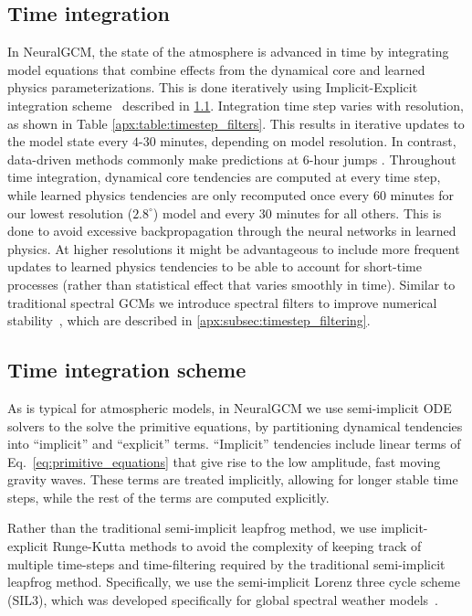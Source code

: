 \documentclass[sn-nature,Numbered]{sn-jnl}%
\begin{document}
\begin{appendices}
\section{Time integration}\label{apx:sec:time_integration}
In NeuralGCM, the state of the atmosphere is advanced in time by
integrating model equations that combine effects from the dynamical
core and learned physics parameterizations. This is done iteratively
using Implicit-Explicit integration scheme~\cite{whitaker2013implicit}
described in \ref{apx:subsec:sil3}. Integration time step varies with
resolution, as shown in Table \ref{apx:table:timestep_filters}. This
results in iterative updates to the model state every $4$-$30$
minutes, depending on model resolution. In contrast, data-driven
methods commonly make predictions at $6$-hour jumps
\cite{lam2022graphcast,keisler2022forecasting}.  Throughout time
integration, dynamical core tendencies are computed at every time
step, while learned physics tendencies are only recomputed once every
$60$ minutes for our lowest resolution ($2.8^{\circ}$) model and every
$30$ minutes for all others. This is done to avoid excessive
backpropagation through the neural networks in learned physics. At
higher resolutions it might be advantageous to include more frequent
updates to learned physics tendencies to be able to account for
short-time processes (rather than statistical effect that varies
smoothly in time).  Similar to traditional spectral GCMs we introduce
spectral filters to improve numerical
stability~, which are described in
\ref{apx:subsec:timestep_filtering}.

\subsection{Time integration scheme}\label{apx:subsec:sil3}

As is typical for atmospheric models, in NeuralGCM we use
semi-implicit ODE solvers to the solve the primitive equations, by
partitioning dynamical tendencies into ``implicit'' and ``explicit''
terms. ``Implicit'' tendencies include linear terms of
Eq.~\ref{eq:primitive_equations} that give rise to the low amplitude,
fast moving gravity waves. These terms are treated implicitly,
allowing for longer stable time steps, while the rest of the terms are
computed explicitly.

Rather than the traditional semi-implicit leapfrog method, we use
implicit-explicit Runge-Kutta methods to avoid the complexity of
keeping track of multiple time-steps and time-filtering required by
the traditional semi-implicit leapfrog method.  Specifically, we use
the semi-implicit Lorenz three cycle scheme (SIL3), which was
developed specifically for global spectral weather
models~\cite{whitaker2013implicit}.



\end{appendices}
\end{document}
